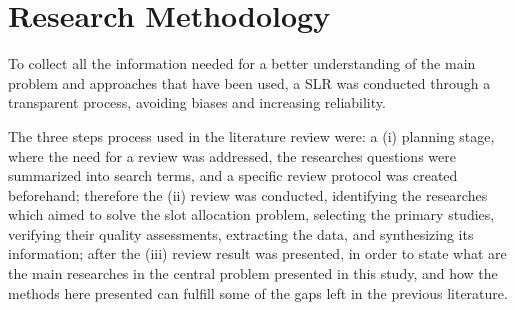 \section{Research Methodology}
\label{section:Planning}

To collect all the information needed for a better understanding of the main problem and approaches that have been used, a \acrfull{SLR} was conducted through a transparent process, avoiding biases and increasing reliability.

The three steps process used in the literature review were: a (i) planning stage, where the need for a review was addressed, the researches questions were summarized into search terms, and a specific review protocol was created beforehand; therefore the (ii) review was conducted, identifying the researches which aimed to solve the slot allocation problem, selecting the primary studies, verifying their quality assessments, extracting the data, and synthesizing its information; after the (iii) review result was presented, in order to state what are the main researches in the central problem presented in this study, and how the methods here presented can fulfill some of the gaps left in the previous literature.


